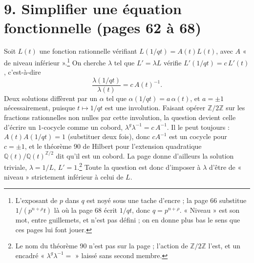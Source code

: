 \documentclass[11pt,a4paper]{article}
\begin{document}
\section*{9. Simplifier une équation fonctionnelle (pages 62 à 68)}

Soit $L(t)$ une fonction rationnelle vérifiant $L(1/qt) = A(t)L(t)$, avec $A$
« de niveau inférieur ».\footnote{L'exposant de $p$ dans $q$ est noyé sous une
tache d'encre ; la page 66 substitue $1/(p^{n+\rho}t)$ là où la page 68 écrit
$1/qt$, donc $q = p^{n+\rho}$. « Niveau » est son mot, entre guillemets, et
n'est pas défini ; on en donne plus bas le sens que ces pages lui font jouer.}
On cherche $\lambda$ tel que $L' = \lambda L$ vérifie $L'(1/qt) = c\,L'(t)$,
c'est-à-dire
\[
  \frac{\lambda(1/qt)}{\lambda(t)} = c\,A(t)^{-1} .
\]
Deux solutions diffèrent par un $\alpha$ tel que $\alpha(1/qt) = a\,\alpha(t)$, et
$a = \pm 1$ nécessairement, puisque $t \mapsto 1/qt$ est une involution.
Faisant opérer $\mathbb{Z}/2\mathbb{Z}$ sur les fractions rationnelles non nulles
par cette involution, la question devient celle d'écrire un $1$-cocycle comme
un cobord, $\lambda^{g}\lambda^{-1} = c\,A^{-1}$. Il le peut toujours :
$A(t)A(1/qt) = 1$ (substituer deux fois), donc $c A^{-1}$ est un cocycle pour
$c = \pm 1$, et le théorème 90 de Hilbert pour l'extension quadratique
$\mathbb{Q}(t)/\mathbb{Q}(t)^{\mathbb{Z}/2}$ dit qu'il est un cobord. La page
donne d'ailleurs la solution triviale, $\lambda = 1/L$, $L' = 1$.\footnote{Le
nom du théorème 90 n'est pas sur la page ; l'action de $\mathbb{Z}/2\mathbb{Z}$
l'est, et un encadré « $\lambda^{g}\lambda^{-1} = $ » laissé sans second
membre.} Toute la question est donc d'imposer à $\lambda$ d'être de « niveau »
strictement inférieur à celui de $L$.
\end{document}
